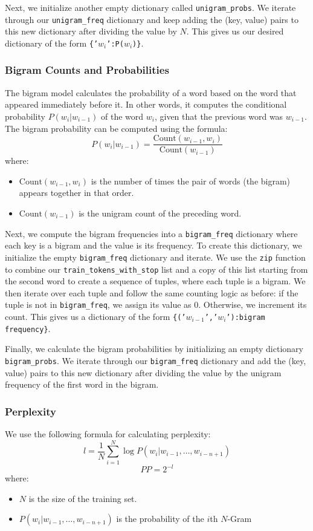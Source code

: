 \documentclass[a4paper]{article}
\begin{document}
Next, we initialize another empty dictionary called \texttt{unigram\_probs}. We iterate through our \texttt{unigram\_freq} dictionary and keep adding the (key, value) pairs to this new dictionary after dividing the value by $N$. This gives us our desired dictionary of the form \texttt{\{'$w_i$':P($w_i$)\}}.

\subsubsection{Bigram Counts and Probabilities}
The bigram model calculates the probability of a word based on the word that appeared immediately before it. In other words, it computes the conditional probability $P(w_i | w_{i-1})$ of the word $w_i$, given that the previous word was $w_{i-1}$. The bigram probability can be computed using the formula:
\[ P(w_i | w_{i-1}) = \frac{\text{Count}(w_{i-1}, w_i)}{\text{Count}(w_{i-1})} \]
where:
\begin{itemize}
    \item $\text{Count}(w_{i-1}, w_i)$ is the number of times the pair of words (the bigram) appears together in that order.
    \item $\text{Count}(w_{i-1})$ is the unigram count of the preceding word.
\end{itemize}

Next, we compute the bigram frequencies into a \texttt{bigram\_freq} dictionary where each key is a bigram and the value is its frequency. To create this dictionary, we initialize the empty \texttt{bigram\_freq} dictionary and iterate. We use the \texttt{zip} function to combine our \texttt{train\_tokens\_with\_stop} list and a copy of this list starting from the second word to create a sequence of tuples, where each tuple is a bigram. We then iterate over each tuple and follow the same counting logic as before: if the tuple is not in \texttt{bigram\_freq}, we assign its value as 0. Otherwise, we increment its count. This gives us a dictionary of the form \texttt{\{('$w_{i-1}$','$w_i$'):bigram frequency\}}.

Finally, we calculate the bigram probabilities by initializing an empty dictionary \texttt{bigram\_probs}. We iterate through our \texttt{bigram\_freq} dictionary and add the (key, value) pairs to this new dictionary after dividing the value by the unigram frequency of the first word in the bigram.

\subsubsection {Perplexity}
We use the following formula for calculating perplexity:
$$ l = \frac{1}{N} \sum_{i=1}^N \log P(w_i | w_{i-1}, \dots, w_{i-n+1})$$
$$ PP = 2^{-l} $$
where:
\begin{itemize}
    \item $N$ is the size of the training set.
    \item $P(w_i | w_{i-1}, \dots, w_{i-n+1})$ is the probability of the $i$th $N$-Gram
\end{itemize}
\end{document}
